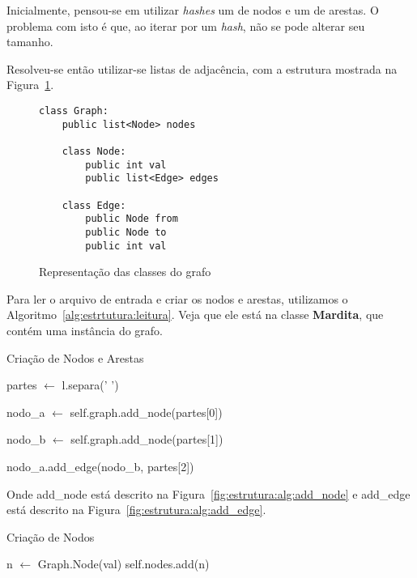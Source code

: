 \documentclass[12pt]{article}
\begin{document}
Inicialmente, pensou-se em utilizar \textit{hashes} um de nodos e um de arestas.
O problema com isto é que, ao iterar por um \textit{hash}, não se pode alterar
seu tamanho.

Resolveu-se então utilizar-se listas de adjacência, com a estrutura mostrada na
Figura~\ref{fig:estrutura:classes}.

\begin{figure}[htb!]
    \begin{lstlisting}
class Graph:
    public list<Node> nodes

    class Node:
        public int val
        public list<Edge> edges

    class Edge:
        public Node from
        public Node to
        public int val
    \end{lstlisting}
  \caption{Representação das classes do grafo}
\label{fig:estrutura:classes}
\end{figure}

Para ler o arquivo de entrada e criar os nodos e arestas, utilizamos o
Algoritmo~\ref{alg:estrtutura:leitura}. Veja que ele está na classe
\textsf{\textbf{Mardita}}, que contém uma instância do grafo.

\begin{algorithm}[H]
 \caption{Criação de Nodos e Arestas}
 \label{alg:estrutura:leitura}
    {
        partes $\gets$ l.separa(' ') 

        nodo\_a $\gets$ self.graph.add\_node(partes[0])

        nodo\_b $\gets$ self.graph.add\_node(partes[1])

        nodo\_a.add\_edge(nodo\_b, partes[2]) 
    }
\end{algorithm}

Onde \textsf{add\_node} está descrito na Figura~\ref{fig:estrutura:alg:add_node}
e \textsf{add\_edge} está descrito na Figura~\ref{fig:estrutura:alg:add_edge}.

\begin{algorithm}[H]
  \caption{Criação de Nodos}
  \label{alg:estrutura:add_node}
  {
    {
       
    }
    n $\gets$ Graph.Node(val) 
    self.nodes.add(n) 
  }
\end{algorithm}
\end{document}
